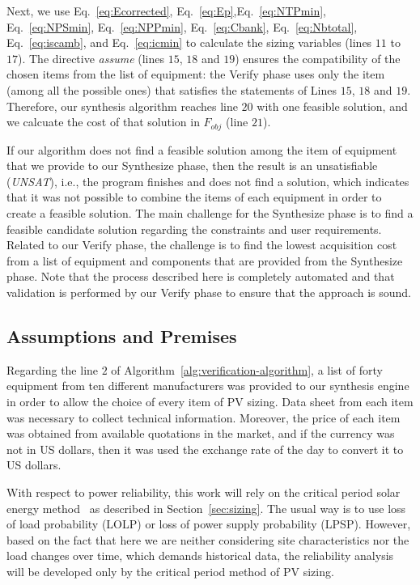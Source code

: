 \documentclass[journal]{IEEEtran}
\begin{document}
Next, we use Eq.~\eqref{eq:Ecorrected}, Eq.~\eqref{eq:Ep},Eq.~\eqref{eq:NTPmin}, 
Eq.~\eqref{eq:NPSmin}, Eq.~\eqref{eq:NPPmin}, Eq.~\eqref{eq:Cbank}, 
Eq.~\eqref{eq:Nbtotal}, Eq.~\eqref{eq:iscamb}, and Eq.~\eqref{eq:icmin} to calculate the sizing variables (lines $11$ to $17$). The directive \textit{assume} (lines $15$, $18$ and $19$) 
ensures the compatibility of the chosen items from the list of equipment: the {\sc Verify} phase uses only the item (among all the possible ones) that satisfies the statements of Lines $15$, $18$ and $19$. Therefore, our synthesis algorithm reaches line $20$ with one feasible solution, and we calcuate the cost of that solution in $F_{obj}$ (line $21$). 

If our algorithm does not find a feasible solution among the item of equipment that we provide to our {\sc Synthesize} phase, then the result is an unsatisfiable (\textit{UNSAT}), i.e., the program finishes and does not find a solution, which indicates that it was not possible to combine the items of each equipment in order to create a feasible solution. 
The main challenge for the {\sc Synthesize} phase is to find a feasible candidate solution regarding the constraints and user requirements. Related to our {\sc Verify} phase, the challenge is to find the lowest acquisition cost from a list of equipment and components that are provided from the {\sc Synthesize} phase. 
Note that the process described here is completely automated and that validation is performed by our {\sc Verify} phase to ensure that the approach is sound.

\subsection{Assumptions and Premises}

Regarding the line $2$ of Algorithm~\ref{alg:verification-algorithm}, a list of forty equipment from ten different manufacturers was provided to our synthesis engine in order to allow the choice of every item of PV sizing. Data sheet from each item was necessary to collect technical information. Moreover, the price of each item was obtained from available quotations in the market, and if the currency was not in US dollars, then it was used the exchange rate of the day to convert it to US dollars.

With respect to power reliability, this work will rely on the critical period solar 
energy method~\cite{Pinho} as described in Section~\ref{sec:sizing}. 
The usual way is to use loss of load probability (LOLP) or loss of power 
supply probability (LPSP). However, based on the fact that here we 
are neither considering site characteristics nor the load changes over time, 
which demands historical data, the reliability analysis will be developed only 
by the critical period method of PV sizing.
\end{document}

